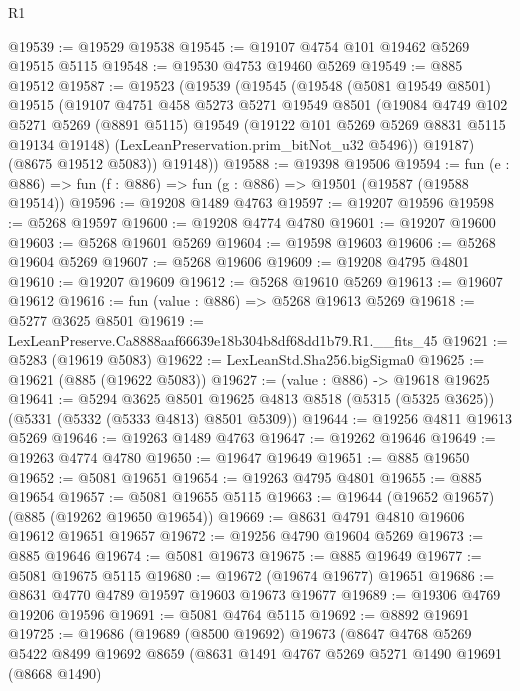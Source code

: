 \begin{lexlean}{R1}
\begin{coremodule}
@19539 := @19529 @19538
@19545 := @19107 @4754 @101 @19462 @5269 @19515 @5115
@19548 := @19530 @4753 @19460 @5269
@19549 := @885 @19512
@19587 := @19523
    (@19539
      (@19545
        (@19548
          (@5081 @19549 @8501)
          @19515
          (@19107
            @4751
            @458
            @5273
            @5271
            @19549
            @8501
            (@19084
              @4749
              @102
              @5271
              @5269
              (@8891 @5115)
              @19549
              (@19122 @101 @5269 @5269 @8831 @5115 @19134 @19148)
              (LexLeanPreservation.prim_bitNot_u32 @5496))
            @19187)
          (@8675 @19512 @5083))
        @19148))
@19588 := @19398 @19506
@19594 := fun (e : @886) => fun (f : @886) => fun (g : @886) => @19501 (@19587 (@19588 @19514))
@19596 := @19208 @1489 @4763
@19597 := @19207 @19596
@19598 := @5268 @19597
@19600 := @19208 @4774 @4780
@19601 := @19207 @19600
@19603 := @5268 @19601 @5269
@19604 := @19598 @19603
@19606 := @5268 @19604 @5269
@19607 := @5268 @19606
@19609 := @19208 @4795 @4801
@19610 := @19207 @19609
@19612 := @5268 @19610 @5269
@19613 := @19607 @19612
@19616 := fun (value : @886) => @5268 @19613 @5269
@19618 := @5277 @3625 @8501
@19619 := LexLeanPreserve.Ca8888aaf66639e18b304b8df68dd1b79.R1.__fits_45
@19621 := @5283 (@19619 @5083)
@19622 := LexLeanStd.Sha256.bigSigma0
@19625 := @19621 (@885 (@19622 @5083))
@19627 := (value : @886) -> @19618 @19625
@19641 := @5294
    @3625
    @8501
    @19625
    @4813
    @8518
    (@5315 (@5325 @3625))
    (@5331 (@5332 (@5333 @4813) @8501 @5309))
@19644 := @19256 @4811 @19613 @5269
@19646 := @19263 @1489 @4763
@19647 := @19262 @19646
@19649 := @19263 @4774 @4780
@19650 := @19647 @19649
@19651 := @885 @19650
@19652 := @5081 @19651
@19654 := @19263 @4795 @4801
@19655 := @885 @19654
@19657 := @5081 @19655 @5115
@19663 := @19644 (@19652 @19657) (@885 (@19262 @19650 @19654))
@19669 := @8631 @4791 @4810 @19606 @19612 @19651 @19657
@19672 := @19256 @4790 @19604 @5269
@19673 := @885 @19646
@19674 := @5081 @19673
@19675 := @885 @19649
@19677 := @5081 @19675 @5115
@19680 := @19672 (@19674 @19677) @19651
@19686 := @8631 @4770 @4789 @19597 @19603 @19673 @19677
@19689 := @19306 @4769 @19206 @19596
@19691 := @5081 @4764 @5115
@19692 := @8892 @19691
@19725 := @19686
    (@19689
      (@8500 @19692)
      @19673
      (@8647
        @4768
        @5269
        @5422
        @8499
        @19692
        @8659
        (@8631
          @1491
          @4767
          @5269
          @5271
          @1490
          @19691
          (@8668 @1490)

\end{coremodule}
\end{lexlean}
